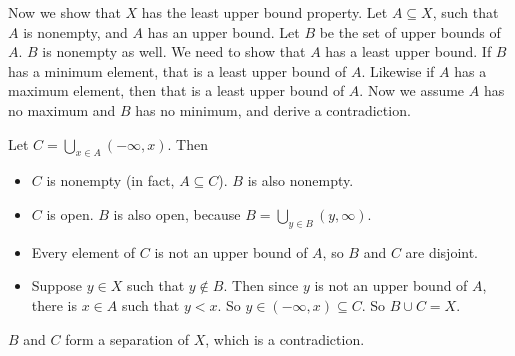Now we show that $X$ has the least upper bound property. Let $A \subseteq X$, such that $A$ is nonempty, and $A$ has an upper bound. Let $B$ be the set of upper bounds of $A$. $B$ is nonempty as well. We need to show that $A$ has a least upper bound. If $B$ has a minimum element, that is a least upper bound of $A$. Likewise if $A$ has a maximum element, then that is a least upper bound of $A$. Now we assume $A$ has no maximum and $B$ has no minimum, and derive a contradiction.

Let $C = \bigcup_{x \in A} (-\infty, x)$. Then 
\begin{itemize}
\item $C$ is nonempty (in fact, $A \subseteq C$). $B$ is also nonempty.
\item $C$ is open. $B$ is also open, because $B = \bigcup_{y \in B} (y, \infty)$.
\item Every element of $C$ is not an upper bound of $A$, so $B$ and $C$ are disjoint.
\item Suppose $y \in X$ such that $y \notin B$. Then since $y$ is not an upper bound of $A$, there is $x \in A$ such that $y < x$. So $y \in (-\infty, x) \subseteq C$. So $B \cup C = X$.
\end{itemize}
$B$ and $C$ form a separation of $X$, which is a contradiction.
